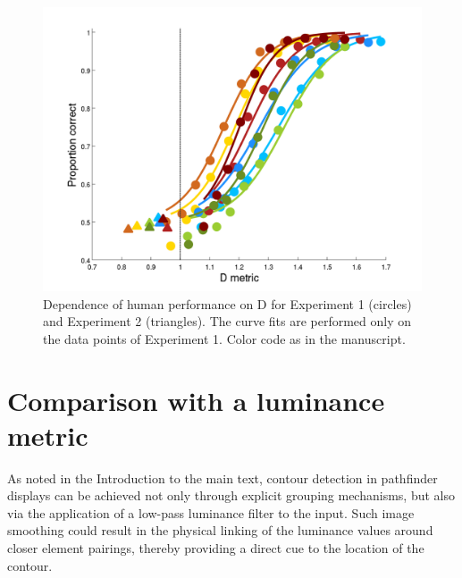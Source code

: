 \documentclass[12pt]{article}
\begin{document}
\begin{figure}
\includegraphics{Figures/FIG_SUP_D.png}
\caption{Dependence of human performance on D for Experiment 1 (circles) and Experiment 2 (triangles). The curve fits are performed only on the data points of Experiment 1. Color code as in the manuscript.}
\label{fig_D}
\end{figure}



\section{Comparison with a luminance metric}

As noted in the Introduction to the main text, contour detection in pathfinder displays can be achieved not only through explicit grouping mechanisms, but also via the application of a low-pass luminance filter to the input. Such image smoothing could result in the physical linking of the luminance values around closer element pairings, thereby providing a direct cue to the location of the contour.\\
\end{document}
